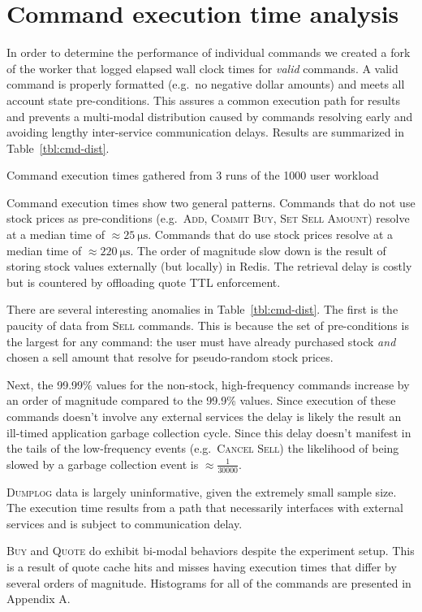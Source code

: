 \section{Command execution time analysis}\label{sec:cmd-dist}
In order to determine the performance of individual commands we created a fork of the worker that logged elapsed wall clock times for \textit{valid} commands.
A valid command is properly formatted (e.g.\ no negative dollar amounts) and meets all account state pre-conditions.
This assures a common execution path for results and prevents a multi-modal distribution caused by commands resolving early and avoiding lengthy inter-service communication delays.
Results are summarized in Table~\ref{tbl:cmd-dist}.

\begin{table}[htpb]
  \centering
  \caption[Command execution time percentiles]{Command execution times gathered from 3 runs of the 1000 user workload}
  \label{tbl:cmd-dist}
  
\end{table}

Command execution times show two general patterns.
Commands that do not use stock prices as pre-conditions (e.g.\ \textsc{Add}, \textsc{Commit Buy}, \textsc{Set Sell Amount}) resolve at a median time of $\approx \SI{25}{\micro\second}$.
Commands that do use stock prices resolve at a median time of $\approx \SI{220}{\micro\second}$.
The order of magnitude slow down is the result of storing stock values externally (but locally) in Redis.
The retrieval delay is costly but is countered by offloading quote TTL enforcement.

There are several interesting anomalies in Table~\ref{tbl:cmd-dist}.
The first is the paucity of data from \textsc{Sell} commands.
This is because the set of pre-conditions is the largest for any command: the user must have already purchased stock \textit{and} chosen a sell amount that resolve for pseudo-random stock prices. 

Next, the 99.99\% values for the non-stock, high-frequency commands increase by an order of magnitude compared to the 99.9\% values.
Since execution of these commands doesn't involve any external services the delay is likely the result an ill-timed application garbage collection cycle.
Since this delay doesn't manifest in the tails of the low-frequency events (e.g.\ \textsc{Cancel Sell}) the likelihood of being slowed by a garbage collection event is $\approx \frac{1}{30000}$.

\textsc{Dumplog} data is largely uninformative, given the extremely small sample size.
The execution time results from a path that necessarily interfaces with external services and is subject to communication delay.

\textsc{Buy} and \textsc{Quote} do exhibit bi-modal behaviors despite the experiment setup.
This is a result of quote cache hits and misses having execution times that differ by several orders of magnitude.
Histograms for all of the commands are presented in Appendix A.
